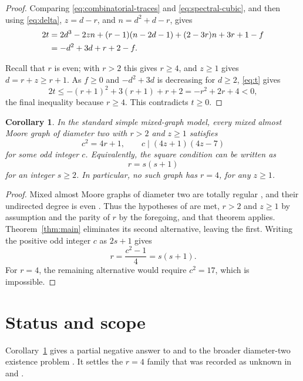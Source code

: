 \documentclass[11pt]{amsart}
\newtheorem{corollary}[theorem]{Corollary}
\begin{document}
\begin{proof}
Comparing \eqref{eq:combinatorial-traces} and
\eqref{eq:spectral-cubic}, and then using \eqref{eq:delta},
$z=d-r$, and $n=d^2+d-r$, gives
\begin{align}
  2t
  &={}2d^3-2zn+(r-1)(n-2d-1)
       +(2-3r)n+3r+1-f
  \notag\\
  &=-d^2+3d+r+2-f.
  \label{eq:t}
\end{align}

Recall that $r$ is even; with $r>2$ this gives $r\geq 4$, and
$z\geq 1$ gives $d=r+z\geq r+1$. As $f\geq 0$ and $-d^2+3d$ is
decreasing for $d\geq 2$, \eqref{eq:t} gives
\[
  2t
  \leq -(r+1)^2+3(r+1)+r+2
  =-r^2+2r+4
  <0,
\]
the final inequality because $r\geq 4$. This contradicts $t\geq 0$.
\end{proof}

\begin{corollary}\label{cor:parameters}
In the standard simple mixed-graph model, every mixed almost Moore
graph of diameter two with $r>2$ and $z\geq 1$ satisfies
\[
  c^2=4r+1,
  \qquad
  c\mid(4z+1)(4z-7)
\]
for some odd integer $c$. Equivalently, the square condition can be
written as
\[
  r=s(s+1)
\]
for an integer $s\geq 2$. In particular, no such graph has $r=4$,
for any $z\geq 1$.
\end{corollary}

\begin{proof}
Mixed almost Moore graphs of diameter two are totally regular
\cite[Theorem~2.8]{TE}, and their undirected degree is even
\cite[Proposition~1]{LM}. Thus the hypotheses of
\cite[Theorem~2]{LM} are met, $r>2$ and $z\geq 1$ by assumption and
the parity of $r$ by the foregoing, and that theorem applies.
Theorem~\ref{thm:main} eliminates its second alternative, leaving the
first. Writing the positive odd integer $c$ as $2s+1$ gives
\[
  r=\frac{c^2-1}{4}=s(s+1).
\]
For $r=4$, the remaining alternative would require $c^2=17$, which
is impossible.
\end{proof}

\section{Status and scope}

Corollary~\ref{cor:parameters} gives a partial negative answer to
\cite[Question~3]{LM} and to the broader diameter-two existence
problem \cite[Problem~5.2]{Shallcross}. It settles the $r=4$ family
that was recorded as unknown in \cite[Table~1]{LM} and
\cite[Table~1]{DFL}.
\end{document}
